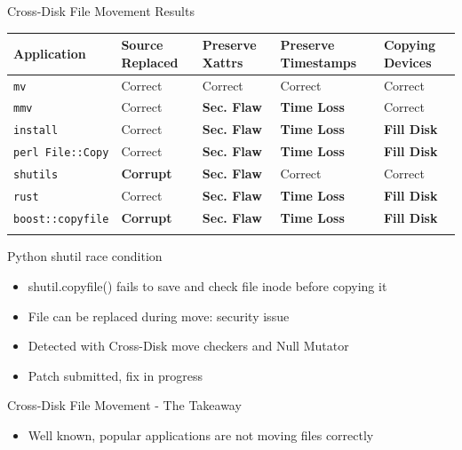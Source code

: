 \documentclass[pdf]{beamer}
\begin{document}
\begin{frame}{Cross-Disk File Movement Results}
 \begin{table}[t]
    \scriptsize{}
    \begin{tabular}{l p{1cm} p{1cm} p{1.2cm} p{1cm}}
    \toprule{}
        Application     & Source Replaced & Preserve Xattrs & Preserve Timestamps & Copying Devices\\
\hline
        {\tt mv}              & Correct             & Correct         & Correct             & Correct\\
        {\tt mmv}             & Correct             & {\bf Sec. Flaw} & {\bf Time Loss} & Correct\\
        {\tt install}         & Correct             & {\bf Sec. Flaw} & {\bf Time Loss} & {\bf Fill Disk} \\
        {\tt perl File::Copy} & Correct             & {\bf Sec. Flaw} & {\bf Time Loss} & {\bf Fill Disk} \\
        {\tt shutils}         & {\bf Corrupt}	& {\bf Sec. Flaw} 	& Correct             & Correct\\
        {\tt rust}             & Correct             & {\bf Sec. Flaw} & {\bf Time Loss} & {\bf Fill Disk} \\
        {\tt boost::copyfile} & {\bf Corrupt}	      & {\bf Sec. Flaw} & {\bf Time Loss} & {\bf Fill Disk} \\
    \bottomrule{}
    \end{tabular}
\end{table}
\end{frame}


\begin{frame}{Python shutil race condition}
  \begin{itemize}
    \item{shutil.copyfile() fails to save and check file inode before
      copying it}
    \item{File can be replaced during move: security issue}
    \item{Detected with Cross-Disk move checkers and Null Mutator}
    \item{Patch submitted, fix in progress}
  \end{itemize}
\end{frame}


\begin{frame}{Cross-Disk File Movement - The Takeaway}
  \begin{itemize}
    \item{Well known, popular applications are not moving files correctly}
  \end{itemize}
\end{frame}
\end{document}
